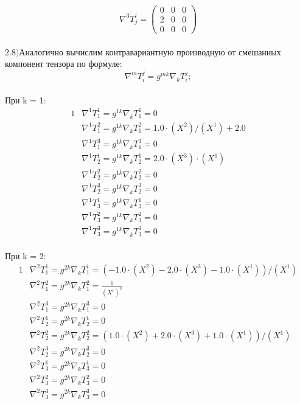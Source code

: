 \documentclass[a4paper, 12pt, oneside]{article}
\begin{document}
\[
\nabla^3T^i_j = \begin{pmatrix}
	0 & 0 & 0\\
	2 & 0 & 0\\
	0 & 0 & 0
\end{pmatrix}
\]\\
$\mathrm{2.8) }$Аналогично вычислим контравариантную производную от смешанных компонент тензора по формуле:\\
\[
\nabla^mT^j_i = g^{mk}\nabla_kT^j_i;
\]\\
При k = 1:\\
\begin{alignat*}{1}
  & \nabla^1T^1_1 = g^{1k}\nabla_kT^1_1 = 0 \\
  & \nabla^1T^2_1 = g^{1k}\nabla_kT^2_1 = 1.0\cdot (X^2)/(X^1) + 2.0 \\
  & \nabla^1T^3_1 = g^{1k}\nabla_kT^3_1 = 0 \\
  & \nabla^1T^1_2 = g^{1k}\nabla_kT^1_2 = 2.0\cdot (X^3)\cdot (X^1) \\
  & \nabla^1T^2_2 = g^{1k}\nabla_kT^2_2 = 0 \\
  & \nabla^1T^3_2 = g^{1k}\nabla_kT^3_2 = 0 \\
  & \nabla^1T^1_3 = g^{1k}\nabla_kT^1_3 = 0 \\
  & \nabla^1T^2_3 = g^{1k}\nabla_kT^2_3 = 0 \\
  & \nabla^1T^3_3 = g^{1k}\nabla_kT^3_3 = 0 
\end{alignat*}\\
При k = 2:\\
\begin{alignat*}{1}
  & \nabla^2T^1_1 = g^{2k}\nabla_kT^1_1 = (-1.0\cdot (X^2) - 2.0\cdot (X^3) - 1.0\cdot (X^1))/(X^1) \\
  & \nabla^2T^2_1 = g^{2k}\nabla_kT^2_1 = \frac{1}{(X^1)^2} \\
  & \nabla^2T^3_1 = g^{2k}\nabla_kT^3_1 = 0 \\
  & \nabla^2T^1_2 = g^{2k}\nabla_kT^1_2 = 0 \\
  & \nabla^2T^2_2 = g^{2k}\nabla_kT^2_2 = (1.0\cdot (X^2) + 2.0\cdot (X^3) + 1.0\cdot (X^1))/(X^1) \\
  & \nabla^2T^3_2 = g^{2k}\nabla_kT^3_2 = 0 \\
  & \nabla^2T^1_3 = g^{2k}\nabla_kT^1_3 = 0 \\
  & \nabla^2T^2_3 = g^{2k}\nabla_kT^2_3 = 0 \\
  & \nabla^2T^3_3 = g^{2k}\nabla_kT^3_3 = 0 
\end{alignat*}\\
\end{document}
